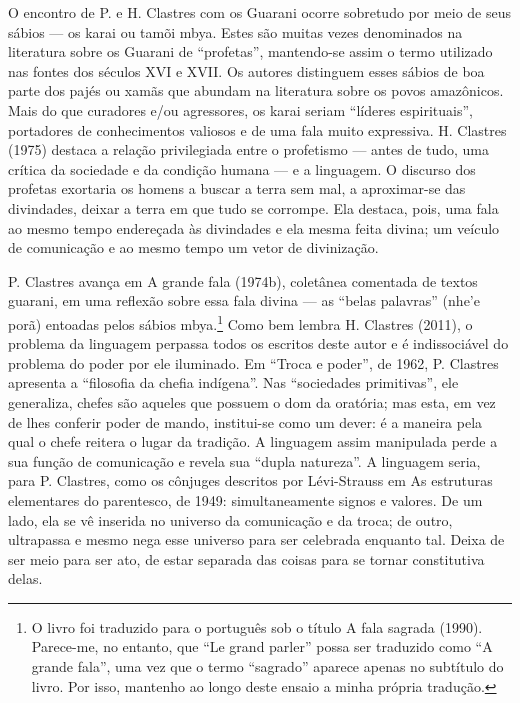 \documentclass{article}
\begin{document}
O encontro de P. e H. Clastres com os Guarani ocorre sobretudo por meio
de seus s\'abios --- os karai ou tam\~oi mbya. Estes s\~ao muitas vezes
denominados na literatura sobre os Guarani de
{\textquotedblleft}profetas{\textquotedblright}, mantendo-se assim o
termo utilizado nas fontes dos s\'eculos XVI e XVII. Os autores
distinguem esses s\'abios de boa parte dos paj\'es ou xam\~as que
abundam na literatura sobre os povos amaz\^onicos. Mais do que
curadores e/ou agressores, os karai seriam {\textquotedblleft}l\'ideres
espirituais{\textquotedblright}, portadores de conhecimentos valiosos e
de uma fala muito expressiva. H. Clastres (1975) destaca a
rela\c{c}\~ao privilegiada entre o profetismo --- antes de tudo, uma
cr\'itica da sociedade e da condi\c{c}\~ao humana --- e a linguagem. O
discurso dos profetas exortaria os homens a buscar a terra sem mal, a
aproximar-se das divindades, deixar a terra em que tudo se corrompe.
Ela destaca, pois, uma fala ao mesmo tempo endere\c{c}ada \`as
divindades e ela mesma feita divina; um ve\'iculo de comunica\c{c}\~ao
e ao mesmo tempo um vetor de diviniza\c{c}\~ao.

P. Clastres avan\c{c}a em A grande fala (1974b), colet\^anea comentada
de textos guarani, em uma reflex\~ao sobre essa fala divina --- as
{\textquotedblleft}belas palavras{\textquotedblright}
(nhe{\textquoteright}e por\~a) entoadas pelos s\'abios mbya.\footnote{
O livro foi traduzido para o portugu\^es sob o t\'itulo A fala sagrada
(1990). Parece-me, no entanto, que {\textquotedblleft}Le grand
parler{\textquotedblright} possa ser traduzido como
{\textquotedblleft}A grande fala{\textquotedblright}, uma vez que o
termo {\textquotedblleft}sagrado{\textquotedblright} aparece apenas no
subt\'itulo do livro. Por isso, mantenho ao longo deste ensaio a minha
pr\'opria tradu\c{c}\~ao.} Como bem lembra H. Clastres (2011), o
problema da linguagem perpassa todos os escritos deste autor e \'e
indissoci\'avel do problema do poder por ele iluminado. Em
{\textquotedblleft}Troca e poder{\textquotedblright}, de 1962, P.
Clastres apresenta a {\textquotedblleft}filosofia da chefia
ind\'igena{\textquotedblright}. Nas {\textquotedblleft}sociedades
primitivas{\textquotedblright}, ele generaliza, chefes s\~ao aqueles
que possuem o dom da orat\'oria; mas esta, em vez de lhes conferir
poder de mando, institui-se como um dever: \'e a maneira pela qual o
chefe reitera o lugar da tradi\c{c}\~ao. A linguagem assim manipulada
perde a sua fun\c{c}\~ao de comunica\c{c}\~ao e revela sua
{\textquotedblleft}dupla natureza{\textquotedblright}. A linguagem
seria, para P. Clastres, como os c\^onjuges descritos por
L\'evi-Strauss em As estruturas elementares do parentesco, de 1949:
simultaneamente signos e valores. De um lado, ela se v\^e inserida no
universo da comunica\c{c}\~ao e da troca; de outro, ultrapassa e mesmo
nega esse universo para ser celebrada enquanto tal. Deixa de ser meio
para ser ato, de estar separada das coisas para se tornar constitutiva
delas. 
\end{document}
